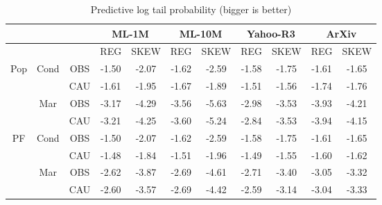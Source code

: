 \begin{table}

\begin{subtable}[t]{\textwidth}
\begin{tabular}{ c  c  c  c c  c c  c c  c c  }
  \toprule
  \multicolumn{3}{c}{} & \multicolumn{2}{c}{\textbf{ML-1M}} & \multicolumn{2}{c}{\textbf{ML-10M}} & \multicolumn{2}{c}{\textbf{Yahoo-R3}} & \multicolumn{2}{c}{\textbf{ArXiv}} \\ \midrule
  \multicolumn{2}{c}{} & & REG & SKEW & REG & SKEW  & REG & SKEW & REG & SKEW  \\ \midrule
  \multirow{4}{*}{Pop} & \multirow{2}{*}{Cond} & OBS & -1.50 & -2.07 & -1.62 & -2.59 & -1.58 & -1.75 & -1.61 & -1.65 \\
  & & CAU & -1.61 & -1.95 & -1.67 & -1.89 & -1.51 & -1.56 & -1.74 & -1.76 \\ \cmidrule{2-11}
  & \multirow{2}{*}{Mar} & OBS & -3.17 & -4.29 & -3.56 & -5.63 & -2.98 & -3.53 & -3.93 & -4.21 \\
  & & CAU & -3.21 & -4.25 & -3.60 & -5.24 & -2.84 & -3.53 & -3.94 & -4.15\\ \midrule
  \multirow{4}{*}{PF} & \multirow{2}{*}{Cond} & OBS & -1.50 & -2.07 & -1.62 & -2.59 & -1.58 & -1.75 & -1.61 & -1.65 \\
  & & CAU & -1.48 & -1.84 & -1.51 & -1.96 & -1.49 & -1.55 & -1.60 & -1.62 \\ \cmidrule{2-11}
  & \multirow{2}{*}{Mar} & OBS &-2.62 & -3.87 & -2.69 & -4.61 & -2.71 & -3.40 & -3.05 & -3.32 \\
  & & CAU & -2.60 & -3.57 & -2.69 & -4.42 & -2.59 & -3.14 & -3.04 & -3.33 \\ \bottomrule
\end{tabular}
\caption{Predictive log tail probability (bigger is better)}\hfill
\label{tab:eval_plp}


\end{subtable}
\end{table}
